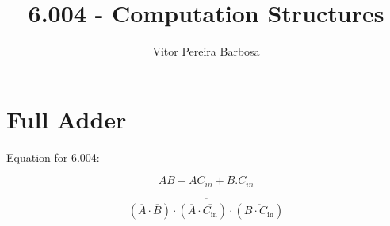 \documentclass[11pt]{article}
\title{6.004 - Computation Structures}
\author{Vitor Pereira Barbosa}
\date{}
\begin{document}
	
	\maketitle
		\section*{Full Adder}

        \vspace{12pt}

            Equation for 6.004:
            
            \begin{equation}
            AB + AC_{in} + B.C_{in}                    
            \end{equation}

\begin{equation}
\overline{\overline{(\overline{A} \cdot \overline{B})} \cdot \overline{(\overline{A} \cdot \overline{C_{\text{in}}})} \cdot \overline{(\overline{B \cdot C_{\text{in}}})}}
\end{equation}

        \vspace{12pt}
\end{document}
